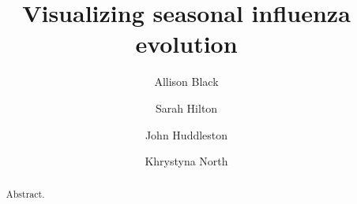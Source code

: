 \documentclass[sigchi]{acmart}
\begin{document}
\title{Visualizing seasonal influenza evolution}

\author{Allison Black}
\author{Sarah Hilton}
\author{John Huddleston}
\author{Khrystyna North}

\renewcommand{\shortauthors}{Black, Hilton, Huddleston, and North}

\begin{abstract}
  Abstract.
\end{abstract}


\end{document}
